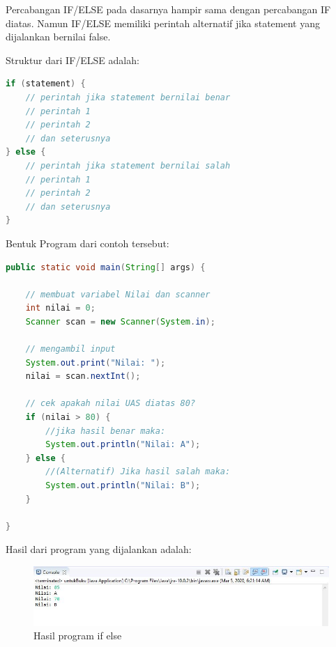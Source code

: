 Percabangan IF/ELSE pada dasarnya hampir sama dengan percabangan IF diatas. Namun IF/ELSE memiliki perintah alternatif jika statement yang dijalankan bernilai false. 

Struktur dari IF/ELSE adalah:
\begin{lstlisting}[language=Java]
if (statement) {
    // perintah jika statement bernilai benar
    // perintah 1
    // perintah 2
    // dan seterusnya
} else {
    // perintah jika statement bernilai salah
    // perintah 1
    // perintah 2
    // dan seterusnya
}
\end{lstlisting}


\noindent{}

\medskip

Bentuk Program dari contoh tersebut:
\begin{lstlisting}[language=Java]
public static void main(String[] args) {

    // membuat variabel Nilai dan scanner
    int nilai = 0;
    Scanner scan = new Scanner(System.in);

    // mengambil input
    System.out.print("Nilai: ");
    nilai = scan.nextInt();

    // cek apakah nilai UAS diatas 80?
    if (nilai > 80) {
        //jika hasil benar maka:
		System.out.println("Nilai: A");
	} else {
		//(Alternatif) Jika hasil salah maka: 
		System.out.println("Nilai: B");
	}

}   
\end{lstlisting}


Hasil dari program yang dijalankan adalah:
\begin{figure}[h!]
    \centering
    \includegraphics[scale=0.6]{pictures/hasil_if_else.jpg}
    \caption{Hasil program if else}
    \label{}
\end{figure}

\newpage
